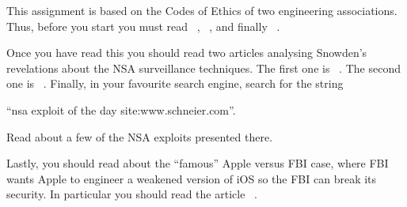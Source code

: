 This assignment is based on the Codes of Ethics of two engineering 
associations.
Thus, before you start you must read
~\cite{acmcode},
~\cite{acmsecode}, and finally
~\cite{ieeecode}.

Once you have read this you should read two articles analysing Snowden's 
revelations about the NSA surveillance techniques.
The first one is ~\cite{landau2013snowden}.
The second one is ~\cite{landau2014highlights}.
Finally, in your favourite search engine, search for the string
\begin{center}
	``nsa exploit of the day site:www.schneier.com''.
\end{center}
Read about a few of the NSA exploits presented there.

Lastly, you should read about the \enquote{famous} Apple versus FBI case, where
FBI wants Apple to engineer a weakened version of iOS so the FBI can break its 
security.
In particular you should read the article 
~\cite{AppleEngineersRebel}.
